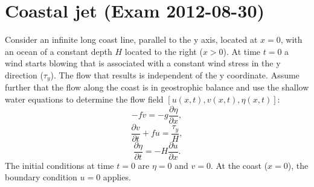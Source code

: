 \documentclass[a4paper,11pt]{article}
\begin{document}
\section{Coastal jet (Exam 2012-08-30)}
Consider an infinite long coast line, parallel to the y axis, located at $x = 0$, with an ocean of a constant depth $H$ located to the right ($x > 0$). At time $t = 0$ a wind starts blowing that is associated with a constant wind stress in the y direction ($\tau_{y}$). The flow that results is independent of the y coordinate. Assume further that the flow along the coast is in geostrophic balance and use the shallow water equations to determine the flow field $[u(x, t),v(x, t),\eta(x, t)]$:
\begin{equation}
-fv = -g\frac{\partial \eta}{\partial x},
\end{equation}
\begin{equation}
\frac{\partial v}{\partial t} + fu = \frac{\tau_{y}}{H},
\end{equation}
\begin{equation}
\frac{\partial \eta}{\partial t} = -H\frac{\partial u}{\partial x}.
\end{equation}
The initial conditions at time $t = 0$ are $\eta = 0$ and $v = 0$. At the coast ($x = 0$), the boundary condition $u = 0$ applies.
\end{document}
